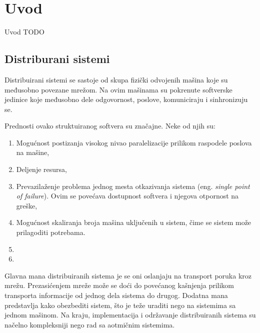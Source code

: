 \documentclass[12pt,oneside]{memoir}
\begin{document}
\frontmatter
\naslovna
\komisija
\apstrakt
\tableofcontents*

\mainmatter

\chapter{Uvod}
Uvod TODO

\section{Distriburani sistemi}

Distribuirani sistemi se sastoje od skupa fizički odvojenih mašina koje su međusobno povezane mrežom. Na ovim mašinama su pokrenute softverske jedinice koje međusobno dele odgovornost, poslove, komuniciraju i sinhronizuju se.

Prednosti ovako struktuiranog softvera su značajne. Neke od njih su:
\begin{enumerate}
\item Mogućnost postizanja visokog nivao paralelizacije prilikom raspodele poslova na mašine,
\item Deljenje resursa,
\item Prevazilaženje problema jednog mesta otkazivanja sistema (eng. \emph{single point of failure}). Ovim se povećava dostupnost softvera i njegova otpornost na greške,
\item Mogućnost skaliranja broja mašina uključenih u sistem, čime se sistem  može prilagoditi potrebama.
\item 
\item 
\end{enumerate}

Glavna mana distribuiranih sistema je se oni oslanjaju na transport poruka kroz mrežu. Prezasićenjem mreže može se doći do povećanog kašnjenja prilikom transporta informacije od jednog dela sistema do drugog. Dodatna mana predstavlja kako obezbediti sistem, što je teže uraditi nego na sistemima sa jednom mašinom. Na kraju, implementacija i održavanje distribuiranih sistema su načelno kompleksniji nego rad sa aotmičnim sistemima.
\end{document}
